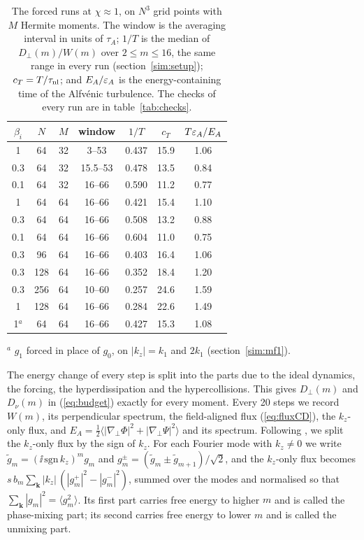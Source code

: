 \begin{table}[tbp]
  \centering
  \caption{The forced runs at $\chi\approx1$, on $N^3$ grid points with $M$ Hermite moments. The window is the averaging interval in units of $\tau_A$; $1/T$ is the median of $D_\perp(m)/W(m)$ over $2\le m\le16$, the same range in every run (section~\ref{sim:setup}); $c_T=T/\tau_{\rm nl}$; and $E_A/\varepsilon_A$ is the energy-containing time of the Alfv\'enic turbulence. The checks of every run are in table~\ref{tab:checks}.}
  \label{tab:runs}
  \begin{tabular}{ccccccc}
    \toprule
    $\beta_i$ & $N$ & $M$ & window & $1/T$ & $c_T$ & $T\varepsilon_A/E_A$ \\
    \midrule
    1 & 64 & 32 & 3--53 & 0.437 & 15.9 & 1.06 \\
    0.3 & 64 & 32 & 15.5--53 & 0.478 & 13.5 & 0.84 \\
    0.1 & 64 & 32 & 16--66 & 0.590 & 11.2 & 0.77 \\
    1 & 64 & 64 & 16--66 & 0.421 & 15.4 & 1.10 \\
    0.3 & 64 & 64 & 16--66 & 0.508 & 13.2 & 0.88 \\
    0.1 & 64 & 64 & 16--66 & 0.604 & 11.0 & 0.75 \\
    0.3 & 96 & 64 & 16--66 & 0.403 & 16.4 & 1.06 \\
    0.3 & 128 & 64 & 16--66 & 0.352 & 18.4 & 1.20 \\
    0.3 & 256 & 64 & 10--60 & 0.257 & 24.6 & 1.59 \\
    1 & 128 & 64 & 16--66 & 0.284 & 22.6 & 1.49 \\
    1$^a$ & 64 & 64 & 16--66 & 0.427 & 15.3 & 1.08 \\
    \bottomrule
  \end{tabular}

  \smallskip
  {\footnotesize $^a$ $g_1$ forced in place of $g_0$, on $|k_z|=k_1$ and $2k_1$ (section~\ref{sim:mf1}).}
\end{table}

The energy change of every step is split into the parts due to the ideal dynamics, the forcing, the hyperdissipation and the hypercollisions. This gives $D_\perp(m)$ and $D_\nu(m)$ in (\ref{eq:budget}) exactly for every moment. Every 20 steps we record $W(m)$, its perpendicular spectrum, the field-aligned flux (\ref{eq:fluxCD}), the $k_z$-only flux, and $E_A=\frac12\langle|\nabla_\perp\Phi|^2+|\nabla_\perp\Psi|^2\rangle$ and its spectrum. Following \citet{Schekochihin2016}, we split the $k_z$-only flux by the sign of $k_z$. For each Fourier mode with $k_z\ne0$ we write $\tilde g_m=(\ii\,\mathrm{sgn}\,k_z)^mg_m$ and $g^\pm_m=(\tilde g_m\pm\tilde g_{m+1})/\sqrt2$, and the $k_z$-only flux becomes $s\,b_m\sum_{\boldsymbol k}|k_z|\,(|g^+_m|^2-|g^-_m|^2)$, summed over the modes and normalised so that $\sum_{\boldsymbol k}|g_m|^2=\langle g_m^2\rangle$. Its first part carries free energy to higher $m$ and is called the phase-mixing part; its second carries free energy to lower $m$ and is called the unmixing part.

